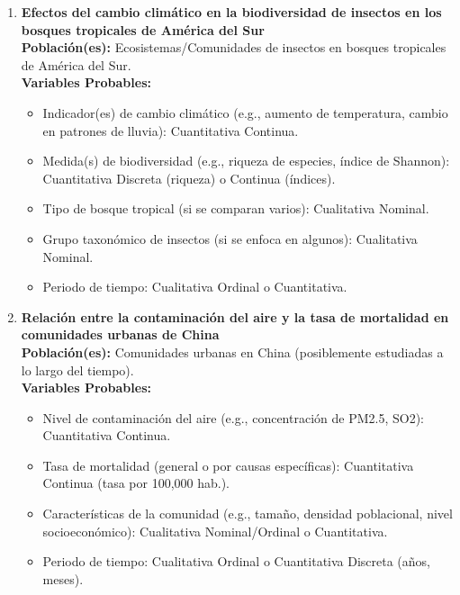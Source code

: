 \documentclass[12pt, letterpaper]{article}
\begin{document}
\begin{enumerate}

\item \textbf{Efectos del cambio climático en la biodiversidad de insectos en los bosques tropicales de América del Sur} \\
\textbf{Población(es):} Ecosistemas/Comunidades de insectos en bosques tropicales de América del Sur. \\
\textbf{Variables Probables:}
\begin{itemize}
  \item Indicador(es) de cambio climático (e.g., aumento de temperatura, cambio en patrones de lluvia): Cuantitativa Continua.
  \item Medida(s) de biodiversidad (e.g., riqueza de especies, índice de Shannon): Cuantitativa Discreta (riqueza) o Continua (índices).
  \item Tipo de bosque tropical (si se comparan varios): Cualitativa Nominal.
  \item Grupo taxonómico de insectos (si se enfoca en algunos): Cualitativa Nominal.
  \item Periodo de tiempo: Cualitativa Ordinal o Cuantitativa.
\end{itemize}

\item \textbf{Relación entre la contaminación del aire y la tasa de mortalidad en comunidades urbanas de China} \\
\textbf{Población(es):} Comunidades urbanas en China (posiblemente estudiadas a lo largo del tiempo). \\
\textbf{Variables Probables:}
\begin{itemize}
  \item Nivel de contaminación del aire (e.g., concentración de PM2.5, SO2): Cuantitativa Continua.
  \item Tasa de mortalidad (general o por causas específicas): Cuantitativa Continua (tasa por 100,000 hab.).
  \item Características de la comunidad (e.g., tamaño, densidad poblacional, nivel socioeconómico): Cualitativa Nominal/Ordinal o Cuantitativa.
  \item Periodo de tiempo: Cualitativa Ordinal o Cuantitativa Discreta (años, meses).
\end{itemize}


\end{enumerate}
\end{document}
